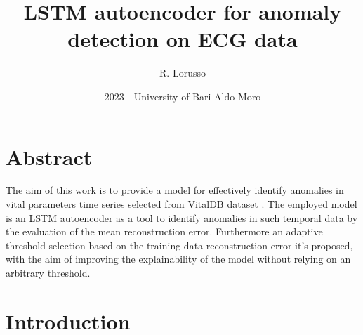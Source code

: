 \documentclass{article}
\begin{document}
	
	
	\title{LSTM autoencoder for anomaly detection on ECG data}
	\author{R. Lorusso}
	\date{2023 - University of Bari Aldo Moro}
	
	\maketitle
	
	\begin{multicols*}{2}
		
		\section*{Abstract}
		\begin{it}
			The aim of this work is to provide a model for effectively identify anomalies in vital parameters time series selected from VitalDB dataset \cite{VitalDB}. The employed model is an LSTM autoencoder as a tool to identify anomalies in such temporal data by the evaluation of the mean reconstruction error.
			Furthermore an adaptive threshold selection based on the training data reconstruction error it's proposed, with the aim of improving the explainability of the model without relying on an arbitrary threshold.
			
			
		\end{it}
		
		
		
		\section{Introduction}
		

\end{multicols*}
\end{document}
